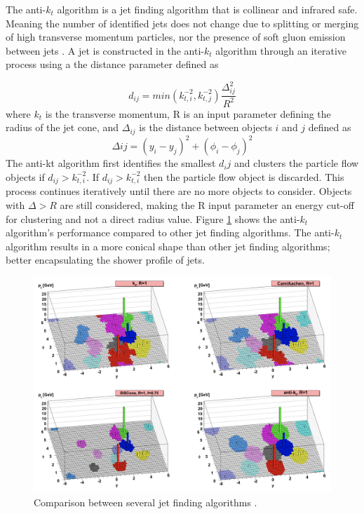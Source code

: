 	The anti-$k_t$ algorithm is a jet finding algorithm that is collinear and infrared safe. Meaning the number of identified jets does not change due to splitting or merging of high transverse momentum particles, nor the presence of soft gluon emission between jets \cite{Cacciari_2008}. A jet is constructed in the anti-$k_t$ algorithm through an iterative process using a the distance parameter defined as 

	\begin{equation}\label{eqn:anti-kt-distance}
	d_{ij} = min(k_{t,i}^{-2} , k_{t,j}^{-2}) \frac{\Delta_{ij}^{2}}{R^2} 
	\end{equation}
	where $k_t$ is the transverse momentum, R is an input parameter defining the radius of the jet cone, and $\Delta_{ij}$ is the distance between objects $i$ and $j$ defined as
	\begin{equation}\label{eqn:anti-kt-delta}
	\Delta{ij} = (y_i - y_j)^2 + (\phi_i - \phi_j)^2
	\end{equation}
	The anti-kt algorithm first identifies the smallest $d_ij$ and clusters the particle flow objects if $d_{ij}>k_{t,i}^{-2}$. If $d_{ij}>k_{t,i}^{-2}$ then the particle flow object is discarded. This process continues iteratively until there are no more objects to consider. Objects with $\Delta>R$ are still considered, making the R input parameter an energy cut-off for clustering and not a direct radius value. Figure \ref{fig:anti-kt-comparison} shows the anti-$k_{t}$ algorithm's performance compared to other jet finding algorithms. The anti-$k_{t}$ algorithm results in a more conical shape than other jet finding algorithms; better encapsulating the shower profile of jets.

	\begin{figure}[!ht]
	\centering
	\includegraphics[width=.5\textwidth,keepaspectratio=true]{chapters/chapter5_eventreconnstruction/images/anti-kt-comparison.png}
	\caption{\label{fig:anti-kt-comparison} Comparison between several jet finding algorithms \cite{anti-kt}.}
	\end{figure}


